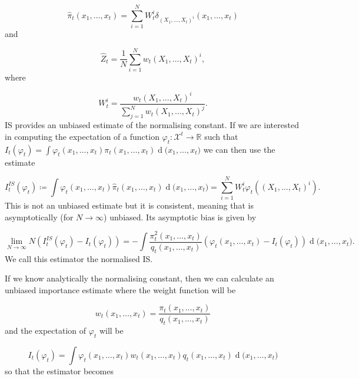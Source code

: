 \documentclass[11pt,a4paper]{article}
\renewcommand{\d}[1]{\ensuremath{\operatorname{d}\!{#1}}}
\begin{document}
\begin{equation*}
    \hat{\pi}_t(x_1, \dots, x_t) = \sum_{i=1}^N W_t^i \delta_{(X_1, \dots, X_t)^i}(x_1, \dots, x_t)
\end{equation*}
and

\begin{equation*}
    \hat{Z}_t =  \frac{1}{N} \sum_{i=1}^N w_t (X_1, \dots, X_t)^i,
\end{equation*}
where

\begin{equation*}
    W_t^i = \frac{w_t (X_1, \dots, X_t)^i}{\sum_{j=1}^N w_t (X_1, \dots, X_t)^j}.
\end{equation*}
IS provides an unbiased estimate of the normalising constant. If we are interested in computing the expectation of a function $\varphi_t : \mathcal{X}^t \rightarrow \mathbb{R}$ such that $I_t(\varphi_t) = \int \varphi_t (x_1, \dots, x_t) \pi_t (x_1, \dots, x_t) \d (x_1, \dots, x_t)$ we can then use the estimate

\begin{equation*}
    I^{IS}_t(\varphi_t) \coloneqq \int \varphi_t(x_1, \dots, x_t) \hat{\pi}_t (x_1, \dots, x_t) \d (x_1, \dots, x_t) = \sum_{i=1}^N W^i_t\varphi_t((X_1, \dots, X_t)^i).
\end{equation*}
This is not an unbiased estimate but it is consistent, meaning that is asymptotically (for $N \rightarrow \infty$) unbiased. Its asymptotic bias is given by \cite{DoucetTutorial}

\begin{equation*}
    \lim_{N \rightarrow \infty} N (I^{IS}_t(\varphi_t) - I_t(\varphi_t)) = - \int \frac{\pi_t^2 (x_1, \dots, x_t)}{q_t (x_1, \dots, x_t)} (\varphi_t (x_1, \dots, x_t) -  I_t(\varphi_t)) \d (x_1, \dots, x_t).
\end{equation*}
We call this estimator the normalised IS.

If we know analytically the normalising constant, then we can calculate an unbiased importance estimate where the weight function will be

\begin{equation*}
    w_t(x_1, \dots, x_t) = \frac{\pi_t(x_1, \dots, x_t)}{q_t(x_1, \dots, x_t)}
\end{equation*}
and the expectation of $\varphi_t$ will be

\begin{equation*}
    I_t(\varphi_t) = \int \varphi_t (x_1, \dots, x_t) w_t(x_1, \dots, x_t) q_t (x_1, \dots, x_t) \d (x_1, \dots, x_t)
\end{equation*}
so that the estimator becomes
\end{document}
